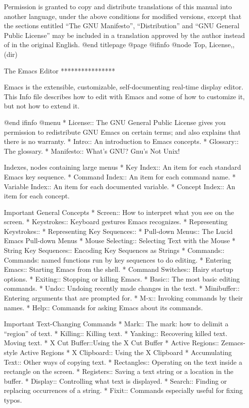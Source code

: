 Permission is granted to copy and distribute translations of this manual
into another language, under the above conditions for modified versions,
except that the sections entitled ``The GNU Manifesto'',
``Distribution'' and ``GNU General Public License'' may be included in a
translation approved by the author instead of in the original English.
@end titlepage
@page
@ifinfo
@node Top, License,, (dir)

The Emacs Editor
****************

Emacs is the extensible, customizable, self-documenting real-time
display editor.  This Info file describes how to edit with Emacs
and some of how to customize it, but not how to extend it.

@end ifinfo
@menu
* License::     The GNU General Public License gives you permission
		to redistribute GNU Emacs on certain terms; and also
		explains that there is no warranty.
* Intro::       An introduction to Emacs concepts.
* Glossary::    The glossary.
* Manifesto::   What's GNU?  Gnu's Not Unix!

Indexes, nodes containing large menus
* Key Index::      An item for each standard Emacs key sequence.
* Command Index::  An item for each command name.
* Variable Index:: An item for each documented variable.
* Concept Index::  An item for each concept.

Important General Concepts
* Screen::      How to interpret what you see on the screen.
* Keystrokes::  Keyboard gestures Emacs recognizes.
* Representing Keystrokes:: 
* Representing Key Sequences:: 
* Pull-down Menus:: 
                The Lucid Emacs Pull-down Menus
* Mouse Selecting:: 
                Selecting Text with the Mouse
* String Key Sequences:: 
                Encoding Key Sequences as Strings
* Commands::    Commands: named functions run by key sequences to do editing.
* Entering Emacs::    
                Starting Emacs from the shell.
* Command Switches::  
                Hairy startup options.
* Exiting::     Stopping or killing Emacs.
* Basic::       The most basic editing commands.
* Undo::        Undoing recently made changes in the text.
* Minibuffer::  Entering arguments that are prompted for.
* M-x::         Invoking commands by their names.
* Help::        Commands for asking Emacs about its commands.

Important Text-Changing Commands
* Mark::        The mark: how to delimit a ``region'' of text.
* Killing::     Killing text.
* Yanking::     Recovering killed text.  Moving text.
* X Cut Buffer::Using the X Cut Buffer
* Active Regions::
                Zemacs-style Active Regions 
* X Clipboard:: Using the X Clipboard
* Accumulating Text::
                Other ways of copying text.
* Rectangles::  Operating on the text inside a rectangle on the screen.
* Registers::   Saving a text string or a location in the buffer.
* Display::     Controlling what text is displayed.
* Search::      Finding or replacing occurrences of a string.
* Fixit::       Commands especially useful for fixing typos.

